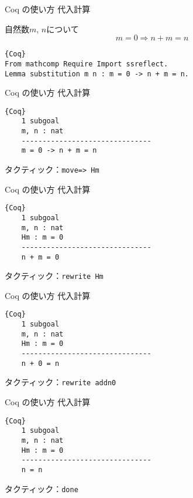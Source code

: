 \documentclass[dvipdfmx,cjk]{beamer}
\theoremstyle{mystyle}
\newcommand{\0}{\textbf{0}}
\begin{document}
\begin{frame}[fragile]{Coq の使い方 代入計算}
	\begin{screen}
	自然数$m$, $n$について
	\[
		m = 0 \Longrightarrow n + m = n
	\]
	\end{screen} \pause
	\begin{lstlisting}{Coq}
From mathcomp Require Import ssreflect.
Lemma substitution m n : m = 0 -> n + m = n. \end{lstlisting}
\end{frame}

\begin{frame}[fragile]{Coq の使い方 代入計算}
	\begin{screen}
		\begin{lstlisting}{Coq}
    1 subgoal
    m, n : nat
    -------------------------------
    m = 0 -> n + m = n \end{lstlisting}
	\end{screen} \pause
	タクティック：{\tt move=> Hm}
\end{frame}

\begin{frame}[fragile]{Coq の使い方 代入計算}
	\begin{screen}
	\begin{lstlisting}{Coq}
    1 subgoal
    m, n : nat
    Hm : m = 0
    -------------------------------
    n + m = 0 \end{lstlisting}
    \end{screen} \pause
    タクティック：{\tt rewrite Hm}
\end{frame}

\begin{frame}[fragile]{Coq の使い方 代入計算}
	\begin{screen}
		\begin{lstlisting}{Coq}
    1 subgoal
    m, n : nat
    Hm : m = 0
    -------------------------------
    n + 0 = n \end{lstlisting}
	\end{screen} \pause
	タクティック：{\tt rewrite addn0}
\end{frame}

\begin{frame}[fragile]{Coq の使い方 代入計算}
	\begin{screen}
		\begin{lstlisting}{Coq}
    1 subgoal
    m, n : nat
    Hm : m = 0
    -------------------------------
    n = n \end{lstlisting}
	\end{screen} \pause
	タクティック：{\tt done}
\end{frame}
\end{document}
